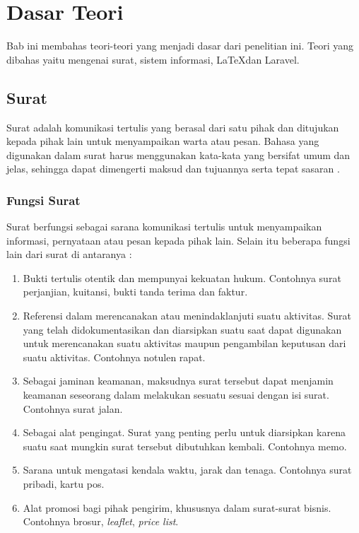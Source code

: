 \chapter{Dasar Teori}
\label{chap:dasar_teori}
Bab ini membahas teori-teori yang menjadi dasar dari penelitian ini. Teori yang dibahas yaitu mengenai surat, sistem informasi, \LaTeX dan Laravel.

\section{Surat}
\label{sec:surat}
Surat adalah komunikasi tertulis yang berasal dari satu pihak dan ditujukan kepada pihak lain untuk menyampaikan warta atau pesan. Bahasa yang digunakan dalam surat harus menggunakan kata-kata yang bersifat umum dan jelas, sehingga dapat dimengerti maksud dan tujuannya serta tepat sasaran \cite{Saiman:2002}.

\subsection{Fungsi Surat}
\label{sec:fungsi_surat}
Surat berfungsi sebagai sarana komunikasi tertulis untuk menyampaikan informasi, pernyataan atau pesan kepada pihak lain. Selain itu beberapa fungsi lain dari surat di antaranya \cite{Pratama:1998}:
\begin{enumerate}
	\item Bukti tertulis otentik dan mempunyai kekuatan hukum. Contohnya surat perjanjian, kuitansi, bukti tanda terima dan faktur.
	\item Referensi dalam merencanakan atau menindaklanjuti suatu aktivitas. Surat yang telah didokumentasikan dan diarsipkan suatu saat dapat digunakan untuk merencanakan suatu aktivitas maupun pengambilan keputusan dari suatu aktivitas. Contohnya notulen rapat.
	\item Sebagai jaminan keamanan, maksudnya surat tersebut dapat menjamin keamanan seseorang dalam melakukan sesuatu sesuai dengan isi surat. Contohnya surat jalan.
	\item Sebagai alat pengingat. Surat yang penting perlu untuk diarsipkan karena suatu saat mungkin surat tersebut dibutuhkan kembali. Contohnya memo.
	\item Sarana untuk mengatasi kendala waktu, jarak dan tenaga. Contohnya surat pribadi, kartu pos. 
	\item Alat promosi bagi pihak pengirim, khususnya dalam surat-surat bisnis. Contohnya brosur, \textit{leaflet}, \textit{price list}.
\end{enumerate}

